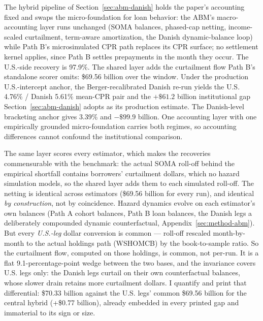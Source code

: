 \documentclass[12pt]{article}
\begin{document}
The hybrid pipeline of Section~\ref{sec:abm-danish} holds the paper's accounting fixed and swaps the micro-foundation for loan behavior: the ABM's macro-accounting layer runs unchanged (SOMA balances, phased-cap netting, income-scaled curtailment, term-aware amortization, the Danish dynamic-balance loop) while Path B's microsimulated CPR path replaces its CPR surface; no settlement kernel applies, since Path B settles prepayments in the month they occur. The U.S.-side recovery is 97.9\%. The shared layer adds the curtailment flow Path B's standalone scorer omits: \$69.56 billion over the window. Under the production U.S.-intercept anchor, the Berger-recalibrated Danish re-run yields the U.S. 4.76\% / Danish 5.61\% mean-CPR pair and the $+\$61.2$ billion institutional gap Section~\ref{sec:abm-danish} adopts as its production estimate. The Danish-level bracketing anchor gives 3.39\% and $-\$99.9$ billion. One accounting layer with one empirically grounded micro-foundation carries both regimes, so accounting differences cannot confound the institutional comparison.

The same layer scores every estimator, which makes the recoveries commensurable with the benchmark: the actual SOMA roll-off behind the empirical shortfall contains borrowers' curtailment dollars, which no hazard simulation models, so the shared layer adds them to each simulated roll-off. The netting is identical across estimators (\$69.56 billion for every run), and identical \emph{by construction}, not by coincidence. Hazard dynamics evolve on each estimator's own balances (Path A cohort balances, Path B loan balances, the Danish legs a deliberately compounded dynamic counterfactual, Appendix~\ref{sec:method-abm}). But every \emph{U.S.-leg} dollar conversion is common --- roll-off rescaled month-by-month to the actual holdings path (WSHOMCB) by the book-to-sample ratio. So the curtailment flow, computed on those holdings, is common, not per-run. It is a flat 9.1-percentage-point wedge between the two bases, and the invariance covers U.S. legs only: the Danish legs curtail on their own counterfactual balances, whose slower drain retains more curtailment dollars. I quantify and print that differential: \$70.33 billion against the U.S. legs' common \$69.56 billion for the central hybrid (+\$0.77 billion), already embedded in every printed gap and immaterial to its sign or size.
\end{document}
